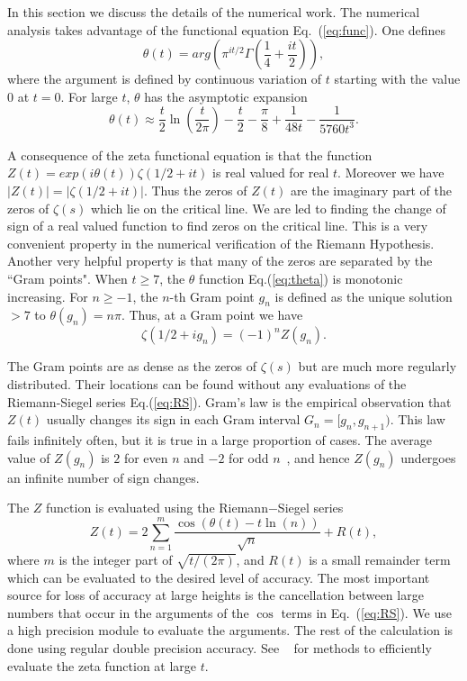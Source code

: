 \documentclass[twoside]{article}
\theoremstyle{definition}
\begin{document}
In this section we discuss the details of the numerical work. 
The numerical analysis takes advantage of the functional 
equation Eq.~(\ref{eq:func}).
One defines
\begin{equation}
\theta(t) = arg (\pi^{it/2} \Gamma(\frac{1}{4} + \frac{it}{2})), 
\label{eq:theta}
\end{equation}
where the argument is defined by continuous variation of $t$ starting with the value $0$ at $t = 0$.
For large $t$, $\theta$ has the asymptotic expansion
\begin{equation}
\theta(t) \approx \frac{t}{2}\ln (\frac{t}{2\pi}) - \frac{t}{2} - \frac{\pi}{8} + \frac{1}{48t} - \frac{1}{5760t^3}. 
\label{eq:thetaAsymptotic}
\end{equation}

A consequence of the zeta functional equation is that the function 
$Z(t)=exp(i\theta(t))\zeta(1/2 +it)$ is real valued for real $t$. 
Moreover we have $|Z(t)| = |\zeta(1/2+it)|$. Thus the zeros of $Z(t)$ are the imaginary part of the zeros 
of $\zeta(s)$ which lie on the critical line. We are led to finding the change of sign of a real valued function 
to find zeros on the critical line. This is a very convenient property in the numerical verification 
of the Riemann Hypothesis. Another very helpful property is that many of the zeros are separated by the
``Gram points".  When $t \ge 7$, the $\theta$ function Eq.(\ref{eq:theta}) is monotonic increasing. 
For $n \ge -1$, the $n$-th Gram point $g_n$ is defined as the unique solution $> 7$ to
$\theta (g_n) = n\pi$. Thus, at a Gram point we have
\begin{equation}
\zeta(1/2+ig_n) = (-1)^{n}Z(g_n).
\label{eq:zetagram}
\end{equation}

The Gram points are as dense as the zeros of $\zeta(s)$ but are much more regularly distributed.
Their locations can be found without any evaluations of the Riemann-Siegel series Eq.(\ref{eq:RS}).
Gram's law is the empirical observation that $Z(t)$ usually changes its sign in each Gram interval 
$G_n = [g_n,g_{n+1})$. 
This law fails infinitely often, but it is true in a large proportion of cases.
The average value of $Z(g_n)$ is $2$ for even $n$ and $-2$ for odd $n$~\cite{Titchmarsh 1986},
and hence $Z(g_n)$ undergoes an infinite number of sign changes.

The $Z$ function is evaluated using the Riemann$-$Siegel series
\begin{equation}
Z(t) = 2\sum^{m}_{n=1}\frac{\cos(\theta(t) - t \ln (n))}{\sqrt{n}} + R(t), 
\label{eq:RS}
\end{equation}
where $m$ is the integer part of $\sqrt{t/(2\pi)}$, and $R(t)$ is a small remainder
term which can be evaluated to the desired level of accuracy. The most important 
source for loss of accuracy at large heights is the cancellation between
large numbers that occur in the arguments of the $\cos$ terms in Eq.~(\ref{eq:RS}). We 
use a high precision module to evaluate the arguments. The rest of the calculation
is done using regular double precision accuracy. See ~\cite{hiary,gourdon,Odlyzko(1989)} for methods to efficiently evaluate the zeta function at large $t$.
\end{document}
